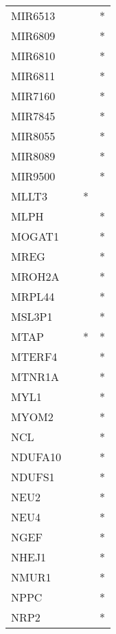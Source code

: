 \begin{longtable}{lccc}
MIR6513        &           &     &       * \\
MIR6809        &           &     &       * \\
MIR6810        &           &     &       * \\
MIR6811        &           &     &       * \\
MIR7160        &           &     &       * \\
MIR7845        &           &     &       * \\
MIR8055        &           &     &       * \\
MIR8089        &           &     &       * \\
MIR9500        &           &     &       * \\
MLLT3          &           &   * &         \\
MLPH           &           &     &       * \\
MOGAT1         &           &     &       * \\
MREG           &           &     &       * \\
MROH2A         &           &     &       * \\
MRPL44         &           &     &       * \\
MSL3P1         &           &     &       * \\
MTAP           &           &   * &       * \\
MTERF4         &           &     &       * \\
MTNR1A         &           &     &       * \\
MYL1           &           &     &       * \\
MYOM2          &           &     &       * \\
NCL            &           &     &       * \\
NDUFA10        &           &     &       * \\
NDUFS1         &           &     &       * \\
NEU2           &           &     &       * \\
NEU4           &           &     &       * \\
NGEF           &           &     &       * \\
NHEJ1          &           &     &       * \\
NMUR1          &           &     &       * \\
NPPC           &           &     &       * \\
NRP2           &           &     &       * \\

\end{longtable}
